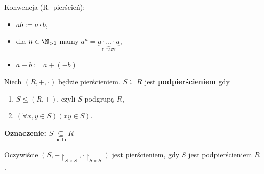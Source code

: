 Konwencja (R- pierścień):
\begin{itemize}
	\item $ab:= a\cdot b$,
	\item dla $n\in \N_{>0}$ mamy $a^{n}=\underbrace{a\cdot \ldots\cdot a}_{\text{n razy}}$,
	\item  $a-b := a+ (-b)$
\end{itemize}
\begin{definition}[Podpierścień.]
	Niech $\left( R,+,\cdot  \right) $ będzie pierścieniem. $S\subseteq R$ jest \textbf{podpierścieniem} gdy
	\begin{enumerate}[label=\arabic*.]
		\item $S\le (R,+)$, czyli $S$ podgrupą  $R$,
		\item  $\left(\forall x,y\in S \right)\left( xy \in S \right)  $.
	\end{enumerate}
	\noindent \textbf{Oznaczenie:} $S \underset{\scriptscriptstyle\text{podp}}{\subseteq}  R$ 
\end{definition} 
\begin{remark}
Oczywiście $(S, +\restriction_{S\times S}, \cdot\restriction_{S\times S})$ jest pierścieniem, gdy $S$ jest podpierścieniem $R$.
\end{remark} 

